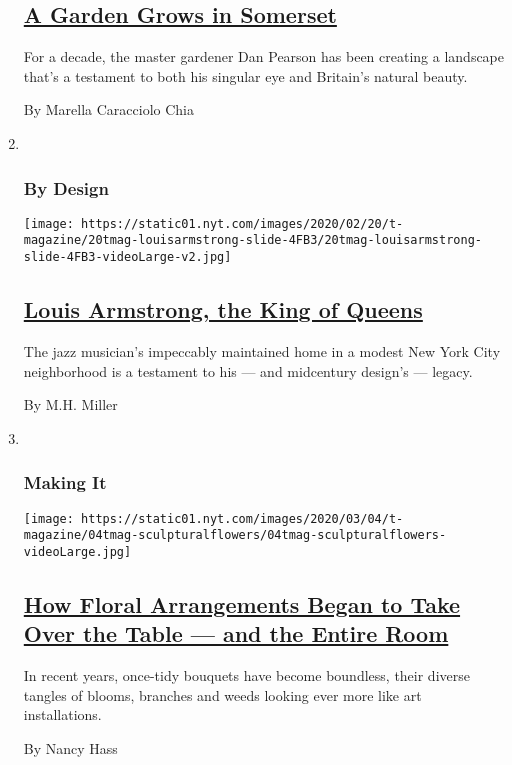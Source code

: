 \begin{enumerate}
  \hypertarget{a-garden-grows-in-somerset}{%
  \subsection{\texorpdfstring{\href{/2020/03/12/t-magazine/master-gardener-dan-pearson.html}{A
  Garden Grows in
  Somerset}}{A Garden Grows in Somerset}}\label{a-garden-grows-in-somerset}}

  For a decade, the master gardener Dan Pearson has been creating a
  landscape that's a testament to both his singular eye and Britain's
  natural beauty.

  By Marella Caracciolo Chia
\item ~
  \hypertarget{by-design}{%
  \subsubsection{By Design}\label{by-design}}

  \texttt{[image: https://static01.nyt.com/images/2020/02/20/t-magazine/20tmag-louisarmstrong-slide-4FB3/20tmag-louisarmstrong-slide-4FB3-videoLarge-v2.jpg]}

  \hypertarget{louis-armstrong-the-king-of-queens}{%
  \subsection{\texorpdfstring{\href{/2020/02/20/t-magazine/louis-armstrong-home-queens.html}{Louis
  Armstrong, the King of
  Queens}}{Louis Armstrong, the King of Queens}}\label{louis-armstrong-the-king-of-queens}}

  The jazz musician's impeccably maintained home in a modest New York
  City neighborhood is a testament to his --- and midcentury design's
  --- legacy.

  By M.H. Miller
\item ~
  \hypertarget{making-it}{%
  \subsubsection{Making It}\label{making-it}}

  \texttt{[image: https://static01.nyt.com/images/2020/03/04/t-magazine/04tmag-sculpturalflowers/04tmag-sculpturalflowers-videoLarge.jpg]}

  \hypertarget{how-floral-arrangements-began-to-take-over-the-table--and-the-entire-room}{%
  \subsection{\texorpdfstring{\href{/2020/03/04/t-magazine/flower-arrangements-sculptures.html}{How
  Floral Arrangements Began to Take Over the Table --- and the Entire
  Room}}{How Floral Arrangements Began to Take Over the Table --- and the Entire Room}}\label{how-floral-arrangements-began-to-take-over-the-table--and-the-entire-room}}

  In recent years, once-tidy bouquets have become boundless, their
  diverse tangles of blooms, branches and weeds looking ever more like
  art installations.

  By Nancy Hass
\end{enumerate}

